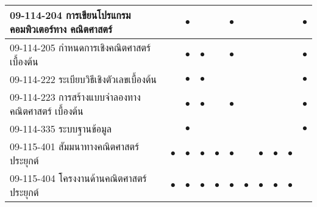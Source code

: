 \begin{longtable}{|>{\raggedright}p{}|c|c|c|c|c|c|c|c|c|c|}
	\hline
	09-114-204 การเขียนโปรแกรมคอมพิวเตอร์ทาง
	คณิตศาสตร์&&{\Large$\bullet$}&&&{\Large$\bullet$}&&&&&{\Large$\bullet$}\\
	\hline
	09-114-205 กำหนดการเชิงคณิตศาสตร์เบื้องต้น&&{\Large$\bullet$}&{\Large$\bullet$}&&{\Large$\bullet$}&&&&&{\Large$\bullet$}\\
	\hline
	09-114-222 ระเบียบวิธีเชิงตัวเลขเบื้องต้น&&{\Large$\bullet$}&{\Large$\bullet$}&&&&&&&{\Large$\bullet$}\\
	\hline
	09-114-223 การสร้างแบบจำลองทางคณิตศาสตร์
	เบื้องต้น&&{\Large$\bullet$}&{\Large$\bullet$}&&{\Large$\bullet$}&&&&&{\Large$\bullet$}\\
	\hline
	09-114-335 ระบบฐานข้อมูล&&{\Large$\bullet$}&&&&&&&&{\Large$\bullet$}\\
	\hline
	09-115-401 สัมมนาทางคณิตศาสตร์ประยุกต์&{\Large$\bullet$}&{\Large$\bullet$}&{\Large$\bullet$}&{\Large$\bullet$}&{\Large$\bullet$}&&{\Large$\bullet$}&{\Large$\bullet$}&{\Large$\bullet$}&\\
	\hline
	09-115-404 โครงงานด้านคณิตศาสตร์ประยุกต์&{\Large$\bullet$}&{\Large$\bullet$}&{\Large$\bullet$}&{\Large$\bullet$}&{\Large$\bullet$}&{\Large$\bullet$}&{\Large$\bullet$}&{\Large$\bullet$}&{\Large$\bullet$}&\\
	\hline
	\end{longtable}


